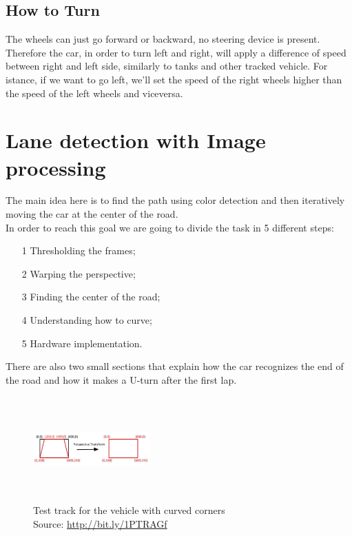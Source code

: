 \documentclass[12pt,a4paper]{article}
\begin{document}
\begin{large}
\subsection{How to Turn}

The wheels can just go forward or backward, no steering device is present. Therefore the car, in order to turn left and right, will apply a difference of speed between right and left side, similarly to tanks and other tracked vehicle.
For istance, if we want to go left, we'll set the speed of the right wheels higher than the speed of the left wheels and viceversa.

\section{Lane detection with Image processing}

The main idea here is to find the path using color detection and then iteratively moving the car at the center of the road.\\
In order to reach this goal we are going to divide the task in 5 different steps:

\begin{itemize}
  \item[1] Thresholding the frames;
  \item[2] Warping the perspective;
  \item[3] Finding the center of the road;
  \item[4] Understanding how to curve;
  \item[5] Hardware implementation.
  \end{itemize}

There are also two small sections that explain how the car recognizes the end of the road and how it makes a U-turn after the first lap.

\begin{figure}[hbp]
\centering
\includegraphics[width=0.4\textwidth, height = 4cm]{images/perspective_transform.jpg}
\caption{\label{fig:5}Test track for the vehicle with curved corners\\Source: \protect\url{http://bit.ly/1PTRAGf}}
\end{figure}


\end{large}
\end{document}
